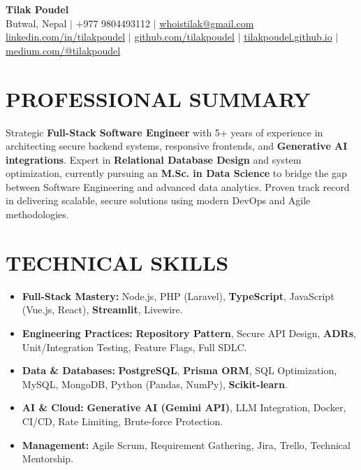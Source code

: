 \documentclass[10pt,a4paper]{article}
\begin{document}
\begin{center}
    {\huge \textbf{\color{primary}Tilak Poudel}} \\
    \vspace{4pt}
    \small Butwal, Nepal $|$ +977 9804493112 $|$ \href{mailto:whoistilak@gmail.com}{whoistilak@gmail.com} \\
    \vspace{2pt}
    \href{https://linkedin.com/in/tilakpoudel}{linkedin.com/in/tilakpoudel} $|$
    \href{https://github.com/tilakpoudel}{github.com/tilakpoudel} $|$
    \href{https://tilakpoudel.github.io}{tilakpoudel.github.io} $|$
    \href{https://medium.com/@tilakpoudel}{medium.com/@tilakpoudel}
\end{center}

\section{PROFESSIONAL SUMMARY}
Strategic \textbf{Full-Stack Software Engineer} with 5+ years of experience in architecting secure backend systems, responsive frontends, and \textbf{Generative AI integrations}. Expert in \textbf{Relational Database Design} and system optimization, currently pursuing an \textbf{M.Sc. in Data Science} to bridge the gap between Software Engineering and advanced data analytics. Proven track record in delivering scalable, secure solutions using modern DevOps and Agile methodologies.

\section{TECHNICAL SKILLS}
\begin{itemize}
    \item \textbf{Full-Stack Mastery:} Node.js, PHP (Laravel), \textbf{TypeScript}, JavaScript (Vue.js, React), \textbf{Streamlit}, Livewire.
    \item \textbf{Engineering Practices:} \textbf{Repository Pattern}, Secure API Design, \textbf{ADRs}, Unit/Integration Testing, Feature Flags, Full SDLC.
    \item \textbf{Data \& Databases:} \textbf{PostgreSQL}, \textbf{Prisma ORM}, SQL Optimization, MySQL, MongoDB, Python (Pandas, NumPy), \textbf{Scikit-learn}.
    \item \textbf{AI \& Cloud:} \textbf{Generative AI (Gemini API)}, LLM Integration, Docker, CI/CD, Rate Limiting, Brute-force Protection.
    \item \textbf{Management:} Agile Scrum, Requirement Gathering, Jira, Trello, Technical Mentorship.
\end{itemize}
\end{document}
